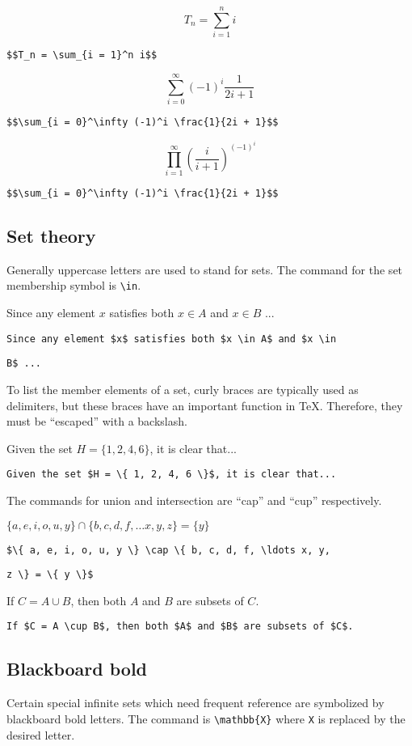 $$T_n = \sum_{i = 1}^n i$$

\verb'$$T_n = \sum_{i = 1}^n i$$'

$$\sum_{i = 0}^\infty (-1)^i \frac{1}{2i + 1}$$

\verb'$$\sum_{i = 0}^\infty (-1)^i \frac{1}{2i + 1}$$'

$$\prod_{i = 1}^\infty \left(\frac{i}{i + 1}\right)^{{(-1)}^i}$$

\verb'$$\sum_{i = 0}^\infty (-1)^i \frac{1}{2i + 1}$$'

\subsection*{Set theory}

Generally uppercase letters are used to stand for sets. The command for the set membership symbol is \verb=\in=.

Since any element $x$ satisfies both $x \in A$ and $x \in B$ ...

\verb'Since any element $x$ satisfies both $x \in A$ and $x \in'

\verb'B$ ...'

To list the member elements of a set, curly braces are typically used as delimiters, but these braces have an important function in \TeX. Therefore, they must be ``escaped'' with a backslash.

Given the set $H = \{ 1, 2, 4, 6 \}$, it is clear that...

\verb'Given the set $H = \{ 1, 2, 4, 6 \}$, it is clear that...'

The commands for union and intersection are ``cap'' and ``cup'' respectively.

$\{ a, e, i, o, u, y \} \cap \{ b, c, d, f, \ldots x, y, z \} = \{ y \}$

\verb'$\{ a, e, i, o, u, y \} \cap \{ b, c, d, f, \ldots x, y,'

\verb'z \} = \{ y \}$'

If $C = A \cup B$, then both $A$ and $B$ are subsets of $C$.

\verb'If $C = A \cup B$, then both $A$ and $B$ are subsets of $C$.'

\subsection{Blackboard bold}

Certain special infinite sets which need frequent reference are symbolized by blackboard bold letters. The command is \verb=\mathbb{X}= where \verb=X= is replaced by the desired letter.

